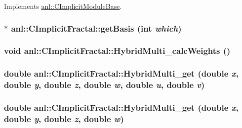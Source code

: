 Implements \hyperlink{classanl_1_1CImplicitModuleBase_ab88f8a1822dcfbc13ba5230318b0acd1}{anl::CImplicitModuleBase}.\hypertarget{classanl_1_1CImplicitFractal_afccdd6ecd1e395b2fae93072398d8be5}{
\subsubsection[{getBasis}]{ $\ast$ anl::CImplicitFractal::getBasis (int {\em which})}}
\label{classanl_1_1CImplicitFractal_afccdd6ecd1e395b2fae93072398d8be5}
\hypertarget{classanl_1_1CImplicitFractal_af457e038a50d1f76daa14ad195970361}{
\subsubsection[{HybridMulti\_\-calcWeights}]{\setlength{\rightskip}{0pt plus 5cm}void anl::CImplicitFractal::HybridMulti\_\-calcWeights ()}}
\label{classanl_1_1CImplicitFractal_af457e038a50d1f76daa14ad195970361}
\hypertarget{classanl_1_1CImplicitFractal_a127e38838bda3bcfd18d94fa63615965}{
\subsubsection[{HybridMulti\_\-get}]{\setlength{\rightskip}{0pt plus 5cm}double anl::CImplicitFractal::HybridMulti\_\-get (double {\em x}, \/  double {\em y}, \/  double {\em z}, \/  double {\em w}, \/  double {\em u}, \/  double {\em v})}}
\label{classanl_1_1CImplicitFractal_a127e38838bda3bcfd18d94fa63615965}
\hypertarget{classanl_1_1CImplicitFractal_a23dd9ce64676454bf0137400c035390e}{
\subsubsection[{HybridMulti\_\-get}]{\setlength{\rightskip}{0pt plus 5cm}double anl::CImplicitFractal::HybridMulti\_\-get (double {\em x}, \/  double {\em y}, \/  double {\em z}, \/  double {\em w})}}
